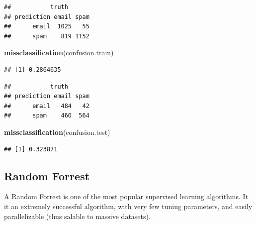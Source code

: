 \documentclass[]{book}
\newenvironment{Shaded}{\begin{snugshade}}{\end{snugshade}}
\newcommand{\CommentTok}[1]{\textcolor[rgb]{0.56,0.35,0.01}{\textit{#1}}}
\newcommand{\DataTypeTok}[1]{\textcolor[rgb]{0.13,0.29,0.53}{#1}}
\newcommand{\FloatTok}[1]{\textcolor[rgb]{0.00,0.00,0.81}{#1}}
\newcommand{\KeywordTok}[1]{\textcolor[rgb]{0.13,0.29,0.53}{\textbf{#1}}}
\newcommand{\NormalTok}[1]{#1}
\newcommand{\OperatorTok}[1]{\textcolor[rgb]{0.81,0.36,0.00}{\textbf{#1}}}
\newcommand{\StringTok}[1]{\textcolor[rgb]{0.31,0.60,0.02}{#1}}
\theoremstyle{definition}
\theoremstyle{definition}
\theoremstyle{definition}
\theoremstyle{remark}
\begin{document}
\begin{verbatim}
##           truth
## prediction email spam
##      email  1025   55
##      spam    819 1152
\end{verbatim}

\begin{Shaded}
\begin{Highlighting}[]
\KeywordTok{missclassification}\NormalTok{(confusion.train)}
\end{Highlighting}
\end{Shaded}

\begin{verbatim}
## [1] 0.2864635
\end{verbatim}

\begin{Shaded}
\end{Shaded}

\begin{verbatim}
##           truth
## prediction email spam
##      email   484   42
##      spam    460  564
\end{verbatim}

\begin{Shaded}
\begin{Highlighting}[]
\KeywordTok{missclassification}\NormalTok{(confusion.test)}
\end{Highlighting}
\end{Shaded}

\begin{verbatim}
## [1] 0.323871
\end{verbatim}

\hypertarget{random-forrest}{%
\subsection{Random Forrest}\label{random-forrest}}

A Random Forrest is one of the most popular supervised learning algorithms.
It it an extremely successful algorithm, with very few tuning parameters, and easily parallelizable (thus salable to massive datasets).
\end{document}

